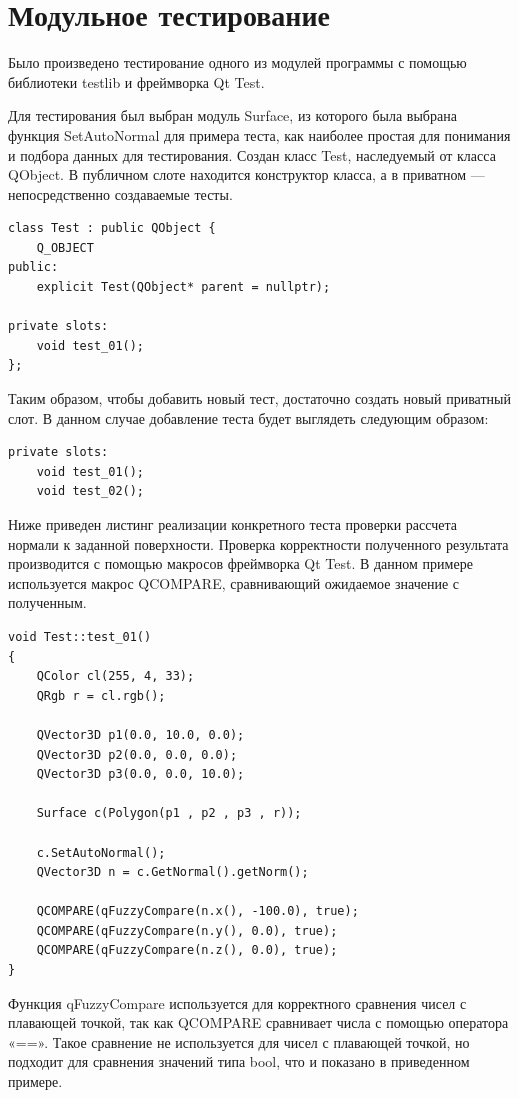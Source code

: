 \documentclass[a4paper,14pt]{extreport}
\begin{document}
\section{Модульное тестирование}
Было произведено тестирование одного из модулей программы с помощью 
библиотеки testlib и фреймворка Qt Test.
\par Для тестирования был выбран модуль Surface, из которого была выбрана 
функция SetAutoNormal для примера теста, как наиболее простая для понимания и подбора 
данных для тестирования. Создан класс Test, наследуемый от класса 
QObject. В публичном слоте находится конструктор класса, а в приватном —
непосредственно создаваемые тесты.
\begin{lstlisting}[label=some-code,caption= Класс Test для тестирования модуля Surface]
class Test : public QObject {
    Q_OBJECT
public:
    explicit Test(QObject* parent = nullptr);

private slots:
    void test_01();
};
\end{lstlisting}
\par Таким образом, чтобы добавить новый тест, достаточно создать новый 
приватный слот. В данном случае добавление теста будет выглядеть следующим 
образом:
\begin{lstlisting}[label=some-code,caption= пример добавления нового модульного теста]
private slots:
    void test_01();
    void test_02();
\end{lstlisting}
\par Ниже приведен листинг реализации конкретного теста проверки рассчета нормали к заданной поверхности. Проверка корректности полученного результата производится с помощью макросов фреймворка Qt Test. В данном примере используется макрос 
QCOMPARE, сравнивающий ожидаемое значение с полученным.
\begin{lstlisting}[label=some-code,caption= реализация модульного теста test\_01]
void Test::test_01()
{
    QColor cl(255, 4, 33);
    QRgb r = cl.rgb();

    QVector3D p1(0.0, 10.0, 0.0);
    QVector3D p2(0.0, 0.0, 0.0);
    QVector3D p3(0.0, 0.0, 10.0);

    Surface c(Polygon(p1 , p2 , p3 , r));

    c.SetAutoNormal();
    QVector3D n = c.GetNormal().getNorm();

    QCOMPARE(qFuzzyCompare(n.x(), -100.0), true);
    QCOMPARE(qFuzzyCompare(n.y(), 0.0), true);
    QCOMPARE(qFuzzyCompare(n.z(), 0.0), true);
}
\end{lstlisting}
\par Функция qFuzzyCompare используется для корректного сравнения чисел с 
плавающей точкой, так как QCOMPARE сравнивает числа с помощью оператора 
«==». Такое сравнение не используется для чисел с плавающей точкой, но 
подходит для сравнения значений типа bool, что и показано в приведенном 
примере.
\end{document}
